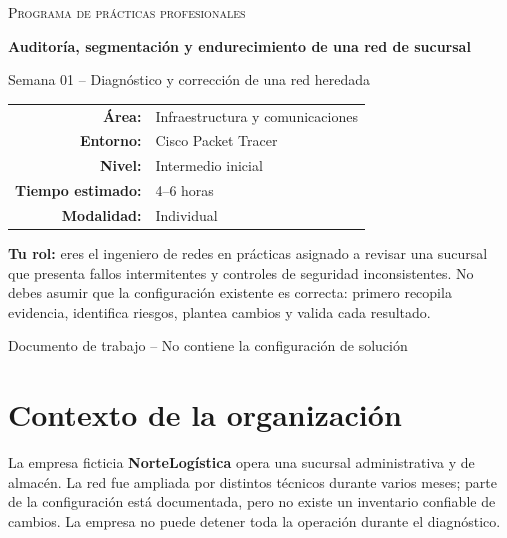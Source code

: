 \documentclass[12pt,a4paper]{article}
\begin{document}
\begin{titlepage}
\centering
\vspace*{1.3cm}
{\Large\textsc{Programa de prácticas profesionales}\par}
\vspace{0.8cm}
{\huge\bfseries Auditoría, segmentación y endurecimiento de una red de sucursal\par}
\vspace{0.5cm}
{\Large Semana 01 -- Diagnóstico y corrección de una red heredada\par}
\vspace{1.5cm}
\begin{tabular}{rl}
\textbf{Área:} & Infraestructura y comunicaciones \\
\textbf{Entorno:} & Cisco Packet Tracer \\
\textbf{Nivel:} & Intermedio inicial \\
\textbf{Tiempo estimado:} & 4--6 horas \\
\textbf{Modalidad:} & Individual \\
\end{tabular}
\vfill
\begin{tcolorbox}[width=0.9\textwidth,colback=grisfondo,colframe=black!30]
\textbf{Tu rol:} eres el ingeniero de redes en prácticas asignado a revisar una sucursal que presenta fallos intermitentes y controles de seguridad inconsistentes. No debes asumir que la configuración existente es correcta: primero recopila evidencia, identifica riesgos, plantea cambios y valida cada resultado.
\end{tcolorbox}
\vfill
{\large Documento de trabajo -- No contiene la configuración de solución\par}
\end{titlepage}

\tableofcontents
\newpage

\section{Contexto de la organización}

La empresa ficticia \textbf{NorteLogística} opera una sucursal administrativa y de almacén. La red fue ampliada por distintos técnicos durante varios meses; parte de la configuración está documentada, pero no existe un inventario confiable de cambios. La empresa no puede detener toda la operación durante el diagnóstico.
\end{document}
